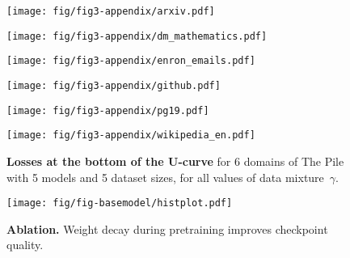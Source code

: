 \begin{figure*}

    \centering
    \begin{minipage}{0.45\textwidth}
        \texttt{[image: fig/fig3-appendix/arxiv.pdf]}
    \end{minipage}
    \begin{minipage}{0.45\textwidth}
        \texttt{[image: fig/fig3-appendix/dm\_mathematics.pdf]}
    \end{minipage}
    \begin{minipage}{0.45\textwidth}
        \texttt{[image: fig/fig3-appendix/enron\_emails.pdf]}
    \end{minipage}
    \begin{minipage}{0.45\textwidth}
        \texttt{[image: fig/fig3-appendix/github.pdf]}
    \end{minipage}
    \begin{minipage}{0.45\textwidth}
        \texttt{[image: fig/fig3-appendix/pg19.pdf]}
    \end{minipage}
    \begin{minipage}{0.45\textwidth}
        \texttt{[image: fig/fig3-appendix/wikipedia\_en.pdf]}
    \end{minipage}
    \label{fig:fig3appendix}
    
    \caption{\textbf{Losses at the bottom of the U-curve} for 6 domains of The Pile with 5 models and 5 dataset sizes, for all values of data mixture~$\gamma$.}
\end{figure*}


\begin{figure}
    \centering
    \texttt{[image: fig/fig-basemodel/histplot.pdf]}
    \caption{\textbf{Ablation.} Weight decay during pretraining improves checkpoint quality.}
    \label{fig:weight_decay}
\end{figure}

